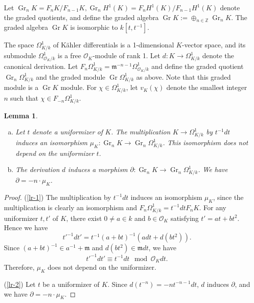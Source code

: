 \documentclass[sn-mathphys-num]{sn-jnl}
\numberwithin{equation}{section}
\newcommand{\Gr}{\operatorname{Gr}}
\theoremstyle{plain}
\newtheorem{lemm}[theo]{Lemma}
\theoremstyle{definition}
\begin{document}
Let $\Gr_nK=F_nK/F_{n-1}K,\Gr_nH^1(K)=F_nH^1(K)/F_{n-1}H^1(K)$ denote the graded quotients, and define the graded algebra $\Gr K:=\oplus_{n\in\mathbb{Z}}\Gr_nK$. The graded algebra $\Gr K$ is isomorphic to $k[t,t^{-1}]$.

The space $\Omega_{K/k}^1$ of K\"ahler differentials is a 1-dimensional $K$-vector space, and its submodule $\Omega_{\mathcal{O}_K/k}^1$ is a free $\mathcal{O}_K$-module of rank 1. Let $d:K\to\Omega_{K/k}^1$ denote the canonical derivation. Let $F_n\Omega_{K/k}^1=\mathfrak{m}^{-n-1}\Omega_{\mathcal{O}_K/k}^1$ and define the graded quotient $\Gr_n\Omega_{K/k}^1$ and the graded module $\Gr\Omega_{K/k}^1$ as above. Note that this graded module is a $\Gr K$ module. For $\chi\in \Omega_{K/k}^1$, let  $v_K(\chi)$ denote the smallest integer $n$ such that $\chi\in F_{-n}\Omega_{K/k}^1$.\\

\begin{lemm}\label{lr}
\begin{enumerate}[(a)]
 \item\label{lr-1} Let $t$ denote a uniformizer of $K$. The multiplication $K\to\Omega_{K/k}^1$ by $t^{-1}dt$ induces an isomorphism $\mu_{K}:\Gr_nK\to\Gr_n\Omega_{K/k}^1$. This isomorphism does not depend on the uniformizer $t$.
 \item\label{lr-2} The derivation $d$ induces a morphism $\partial:\Gr_nK\to\Gr_n\Omega_{K/k}^1$. We have $\partial=-n\cdot\mu_{K}$.
\end{enumerate}
\end{lemm}
\begin{proof} (\ref{lr-1}) The multiplication by $t^{-1}dt$ induces an isomorphism $\mu_{K}$, since the multiplication is clearly an isomorphism and $F_n\Omega_{K/k}^1=t^{-1}dtF_nK$. For any uniformizer $t,t'$ of $K$, there exist $0\neq a\in k$ and $b\in\mathcal{O}_K$ satisfying $t'=at+bt^2$. Hence we have
  \begin{equation}
  t'^{-1}dt'=t^{-1}(a+bt)^{-1}(adt+ d(bt^2)).
  \end{equation}
  Since $(a+bt)^{-1}\in a^{-1}+\mathfrak{m}$ and $d(bt^2)\in \mathfrak{m}dt$, we have
  \begin{equation}
t'^{-1}dt'\equiv t^{-1}dt \mod \mathcal{O}_Kdt.
\end{equation}
Therefore, $\mu_{K}$ does not depend on the uniformizer.

(\ref{lr-2})  Let $t$ be a uniformizer of $K$. Since $d(t^{-n})=-nt^{-n-1}dt$, $d$ induces $\partial$, and we have $\partial=-n\cdot\mu_{K}$.
\end{proof}
\end{document}
